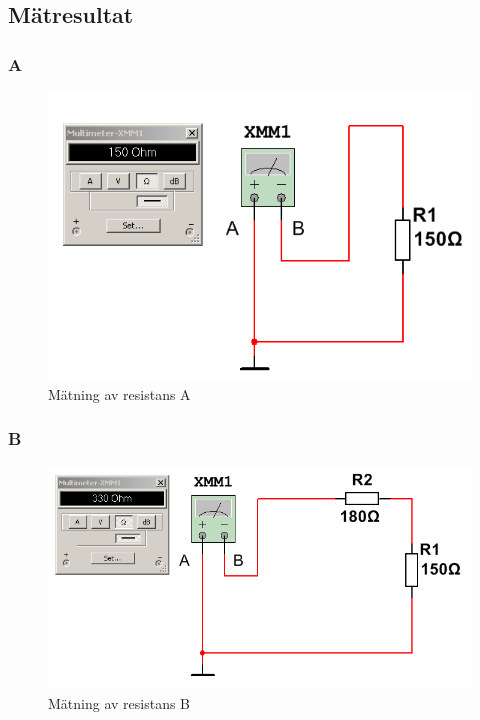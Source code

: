 \documentclass[11pt,a4paper]{article}
\begin{document}
\subsection{Mätresultat}\label{}

\subsubsection{A}
\begin{figure}[htbp]
    \centering
    \includegraphics[scale=0.5]{ee466multisim/4a.png}
    \caption{Mätning av resistans A}
    \label{fig:sim-4a}
\end{figure}

\subsubsection{B}
\begin{figure}[htbp]
    \centering
    \includegraphics[scale=0.5]{ee466multisim/4b.png}
    \caption{Mätning av resistans B}
    \label{fig:sim-4b}
\end{figure}
\end{document}
